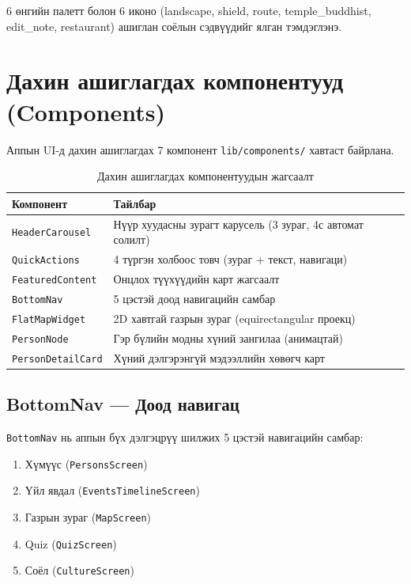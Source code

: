 6 өнгийн палетт болон 6 иконо (landscape, shield, route, temple\_buddhist, edit\_note, restaurant) ашиглан соёлын сэдвүүдийг ялган тэмдэглэнэ.

\section{Дахин ашиглагдах компонентууд (Components)}

Аппын UI-д дахин ашиглагдах 7 компонент \texttt{lib/components/} хавтаст байрлана.

\begin{table}[htbp]
\centering
\begin{tabular}{|p{4.5cm}|p{9cm}|}
\hline
\textbf{Компонент} & \textbf{Тайлбар} \\
\hline
\texttt{HeaderCarousel} & Нүүр хуудасны зурагт карусель (3 зураг, 4с автомат солилт) \\
\hline
\texttt{QuickActions} & 4 түргэн холбоос товч (зураг + текст, навигаци) \\
\hline
\texttt{FeaturedContent} & Онцлох түүхүүдийн карт жагсаалт \\
\hline
\texttt{BottomNav} & 5 цэстэй доод навигацийн самбар \\
\hline
\texttt{FlatMapWidget} & 2D хавтгай газрын зураг (equirectangular проекц) \\
\hline
\texttt{PersonNode} & Гэр бүлийн модны хүний зангилаа (анимацтай) \\
\hline
\texttt{PersonDetailCard} & Хүний дэлгэрэнгүй мэдээллийн хөвөгч карт \\
\hline
\end{tabular}
\caption{Дахин ашиглагдах компонентуудын жагсаалт}
\label{tab:components}
\end{table}

\subsection{BottomNav — Доод навигац}

\texttt{BottomNav} нь аппын бүх дэлгэцрүү шилжих 5 цэстэй навигацийн самбар:

\begin{enumerate}
	\item Хүмүүс (\texttt{PersonsScreen})
	\item Үйл явдал (\texttt{EventsTimelineScreen})
	\item Газрын зураг (\texttt{MapScreen})
	\item Quiz (\texttt{QuizScreen})
	\item Соёл (\texttt{CultureScreen})
\end{enumerate}

